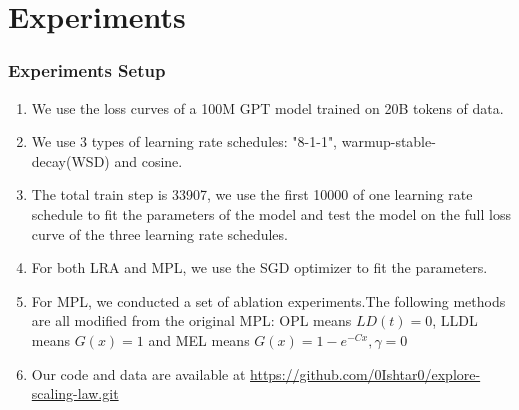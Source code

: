 \documentclass[aspectratio=169]{beamer}
\begin{document}
    \section{Experiments}\label{sec:experiments}

    \begin{frame}
        \frametitle{Experiments Setup}
        \begin{enumerate}
            \item We use the loss curves of a 100M GPT model trained on
            20B tokens of data.
            \item We use 3 types of learning rate schedules: "8-1-1",
            warmup-stable-decay(WSD) and cosine.
            \item The total train step is 33907, we use the first 10000
            of one learning rate schedule to fit the parameters of
            the model and test the model on the full loss curve of
            the three learning rate schedules.
            \item For both LRA and MPL, we use the SGD optimizer to fit the parameters.
            \item For MPL, we conducted a set of ablation experiments.The following methods are all
            modified from the original MPL: OPL means $LD(t)=0$, LLDL means $G(x)=1$ and MEL means $G(x) = 1-e^{-Cx},\gamma = 0$
            \item Our code and data are available at \url{https://github.com/0Ishtar0/explore-scaling-law.git}
        \end{enumerate}
    \end{frame}
\end{document}
